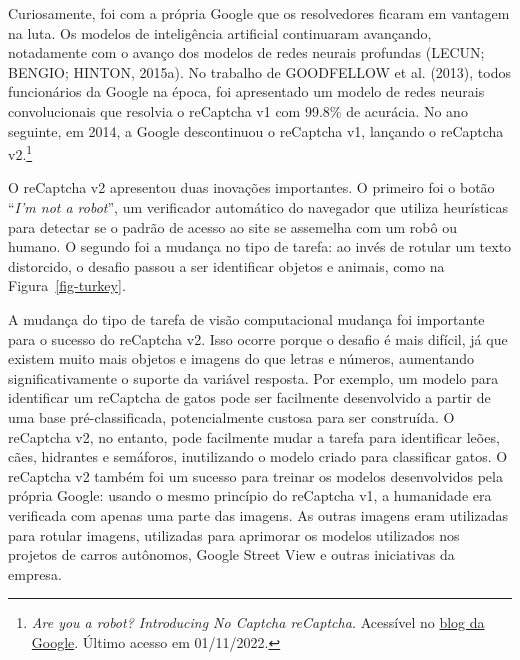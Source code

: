 \documentclass[12pt,twoside,brazilian]{book}
\begin{document}
Curiosamente, foi com a própria Google que os resolvedores ficaram em
vantagem na luta. Os modelos de inteligência artificial continuaram
avançando, notadamente com o avanço dos modelos de redes neurais
profundas (LECUN; BENGIO; HINTON, 2015a). No trabalho de GOODFELLOW et
al. (2013), todos funcionários da Google na época, foi apresentado um
modelo de redes neurais convolucionais que resolvia o reCaptcha v1 com
99.8\% de acurácia. No ano seguinte, em 2014, a Google descontinuou o
reCaptcha v1, lançando o reCaptcha v2.\footnote{\emph{Are you a robot?
  Introducing No Captcha reCaptcha.} Acessível no
  \href{https://security.googleblog.com/2014/12/are-you-robot-introducing-no-captcha.html}{blog
  da Google}. Último acesso em 01/11/2022.}

O reCaptcha v2 apresentou duas inovações importantes. O primeiro foi o
botão ``\emph{I'm not a robot}'', um verificador automático do navegador
que utiliza heurísticas para detectar se o padrão de acesso ao site se
assemelha com um robô ou humano. O segundo foi a mudança no tipo de
tarefa: ao invés de rotular um texto distorcido, o desafio passou a ser
identificar objetos e animais, como na Figura~\ref{fig-turkey}.

A mudança do tipo de tarefa de visão computacional mudança foi
importante para o sucesso do reCaptcha v2. Isso ocorre porque o desafio
é mais difícil, já que existem muito mais objetos e imagens do que
letras e números, aumentando significativamente o suporte da variável
resposta. Por exemplo, um modelo para identificar um reCaptcha de gatos
pode ser facilmente desenvolvido a partir de uma base pré-classificada,
potencialmente custosa para ser construída. O reCaptcha v2, no entanto,
pode facilmente mudar a tarefa para identificar leões, cães, hidrantes e
semáforos, inutilizando o modelo criado para classificar gatos. O
reCaptcha v2 também foi um sucesso para treinar os modelos desenvolvidos
pela própria Google: usando o mesmo princípio do reCaptcha v1, a
humanidade era verificada com apenas uma parte das imagens. As outras
imagens eram utilizadas para rotular imagens, utilizadas para aprimorar
os modelos utilizados nos projetos de carros autônomos, Google Street
View e outras iniciativas da empresa.
\end{document}
